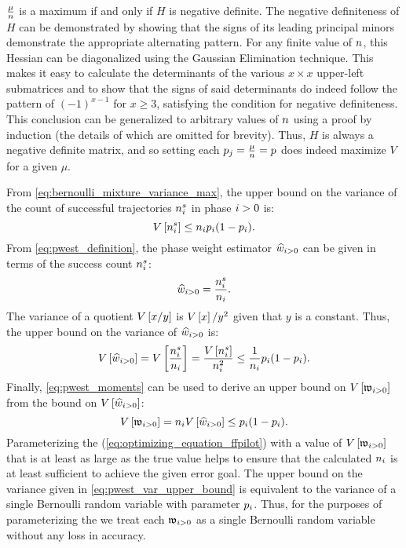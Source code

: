 $\frac{\mu}{n}$ is a maximum if and only if $H$ is negative definite. The negative definiteness of $H$ can be demonstrated by showing that the signs of its leading principal minors demonstrate the appropriate alternating pattern\supercite{Magnus:1999vh}. For any finite value of $n$, this Hessian can be diagonalized using the Gaussian Elimination technique. This makes it easy to calculate the determinants of the various $x \times x$ upper-left submatrices and to show that the signs of said determinants do indeed follow the pattern of $(-1)^{x-1}$ for $x \geq 3$, satisfying the condition for negative definiteness. This conclusion can be generalized to arbitrary values of $n$ using a proof by induction (the details of which are omitted for brevity). Thus, $H$ is always a negative definite matrix, and so setting each $p_{j} = \frac{\mu}{n} = p$ does indeed maximize $V$ for a given $\mu$.

From \eqref{eq:bernoulli_mixture_variance_max}, the upper bound on the variance of the count of successful trajectories $n_{i}^{s}$ in  phase $i>0$ is:
    \begin{equation*}
        V \left[ n_{i}^{s} \right] \leq n_{i} p_{i}(1 - p_{i}).
    \end{equation*}
From \eqref{eq:pwest_definition}, the phase weight estimator $\widehat{w}_{i > 0}$ can be given in terms of the success count $n_{i}^{s}$:
    \begin{equation*}
        \widehat{w}_{i > 0} = \frac{n_{i}^{s}}{n_{i}}.
    \end{equation*}
The variance of a quotient $V \left[ x/y \right]$ is $V \left[ x \right]/y^2$ given that $y$ is a constant\supercite{Riley:2006wb}. Thus, the upper bound on the variance of $\widehat{w}_{i > 0}$ is:
    \begin{equation*}
    \label{eq:pwest_upper_bound}
        V \left[ \widehat{w}_{i > 0} \right] = V \left[ \frac{n_{i}^{s}}{n_{i}} \right] = \frac{V \left[ n_{i}^{s} \right]}{n_{i}^2} \leq \frac{1}{n_{i}} p_{i}(1 - p_{i}).
    \end{equation*}
Finally, \eqref{eq:pwest_moments} can be used to derive an upper bound on $V \left[ \mathfrak{w}_{i > 0} \right]$ from the bound on $V \left[ \widehat{w}_{i > 0} \right]$:
    \begin{equation}
        \label{eq:pwest_var_upper_bound}
        V \left[ \mathfrak{w}_{i > 0} \right] = n_{i} V \left[ \widehat{w}_{i > 0} \right] \leq p_{i}(1 - p_{i}).
    \end{equation}
Parameterizing the \opteq{} (\eqref{eq:optimizing_equation_ffpilot}) with a value of $V \left[ \mathfrak{w}_{i > 0} \right]$ that is at least as large as the true value helps to ensure that the calculated $n_{i}$ is at least sufficient to achieve the given error goal. The upper bound on the variance given in \eqref{eq:pwest_var_upper_bound} is equivalent to the variance of a single Bernoulli random variable with parameter $p_{i}$. Thus, for the purposes of parameterizing the \opteq{} we treat each $\mathfrak{w}_{i > 0}$ as a single Bernoulli random variable without any loss in accuracy.

